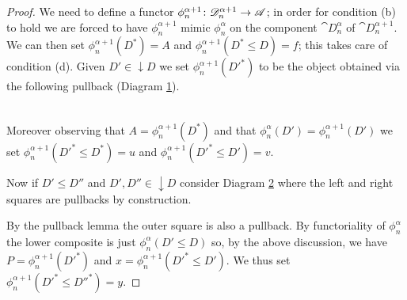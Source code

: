 \begin{proof}
  We need to define a functor \(\phi_n^{\alpha+1}\colon {\mathscr D}_n^{\alpha+1}\to {\mathscr A}\); in order for condition (b) to hold we are forced to have \(\phi_n^{\alpha+1}\) mimic \(\phi_n^\alpha\)  on the component \(\cat{D}_n^\alpha\) of \(\cat{D}_n^{\alpha+1}\). We can then set \(\phi_n^{\alpha+1}(D^*) = A\) and \(\phi_n^{\alpha+1}(D^*\leq D) = f\); this takes care of condition (d). Given \(D'\in{}\downarrow D\) we set \(\phi_n^{\alpha+1}(D'^*)\) to be the object obtained via the following pullback (Diagram \ref{diagram:foo}).
  \begin{figure}[h]
    \begin{center}
    \end{center}
    \caption{}
    \label{diagram:foo}
  \end{figure}\\
  \noindent Moreover observing that \(A = \phi_n^{\alpha+1}(D^*)\) and that \(\phi_n^\alpha(D') = \phi_n^{\alpha+1}(D')\) we set \(\phi_n^{\alpha+1}(D'^*\leq D^*) = u\) and \(\phi_n^{\alpha+1}(D'^*\leq D') = v\).

  Now if \(D'\leq D''\) and \(D',D''\in{}\downarrow D\) consider Diagram \ref{diagram:bar} where the left and right squares are pullbacks by construction.
  \begin{figure}[h]
    \begin{center}
    \end{center}
    \caption{}
    \label{diagram:bar}
  \end{figure}
  By the pullback lemma the outer square is also a pullback. By functoriality of \(\phi_n^\alpha\) the lower composite is just \(\phi_n^\alpha(D'\leq D)\) so, by the above discussion, we have \(P = \phi_n^{\alpha + 1}(D'^*)\) and \(x = \phi_n^{\alpha+1}(D'^*\leq D')\). We thus set \(\phi_n^{\alpha+1}(D'^*\leq D''^*) = y\).
  

\end{proof}
